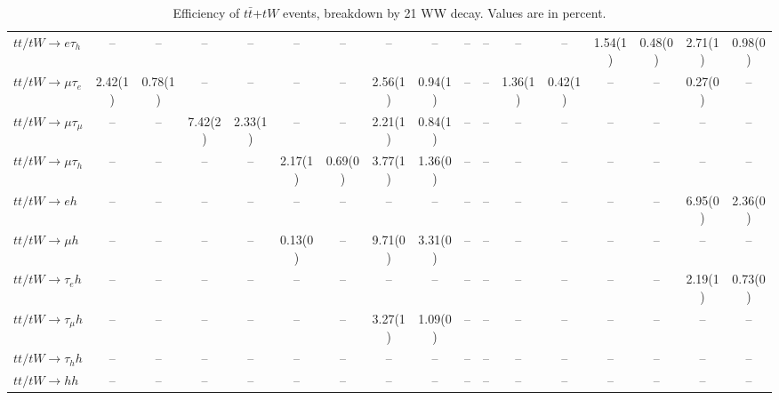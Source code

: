 \begin{sidewaystable}[p]
\begin{tabular}{|l|cc|cc|cc|cc|cc|cc|cc|cc|}
    $tt/tW \to e\tau_{h}$              &    --    &    --    &    --    &    --    &    --    &    --    &    --    &    --    &    --    &    --    &    --    &    --    &  1.54(1) &  0.48(0) &  2.71(1) &  0.98(0) \\ 
    $tt/tW \to \mu\tau_{e}$            &  2.42(1) &  0.78(1) &    --    &    --    &    --    &    --    &  2.56(1) &  0.94(1) &    --    &    --    &  1.36(1) &  0.42(1) &    --    &    --    &  0.27(0) &    --    \\ 
    $tt/tW \to \mu\tau_{\mu}$          &    --    &    --    &  7.42(2) &  2.33(1) &    --    &    --    &  2.21(1) &  0.84(1) &    --    &    --    &    --    &    --    &    --    &    --    &    --    &    --    \\ 
    $tt/tW \to \mu\tau_{h}$            &    --    &    --    &    --    &    --    &  2.17(1) &  0.69(0) &  3.77(1) &  1.36(0) &    --    &    --    &    --    &    --    &    --    &    --    &    --    &    --    \\ 
    $tt/tW \to eh$                     &    --    &    --    &    --    &    --    &    --    &    --    &    --    &    --    &    --    &    --    &    --    &    --    &    --    &    --    &  6.95(0) &  2.36(0) \\ 
    $tt/tW \to \mu h$                  &    --    &    --    &    --    &    --    &  0.13(0) &    --    &  9.71(0) &  3.31(0) &    --    &    --    &    --    &    --    &    --    &    --    &    --    &    --    \\ 
    $tt/tW \to \tau_{e}h$              &    --    &    --    &    --    &    --    &    --    &    --    &    --    &    --    &    --    &    --    &    --    &    --    &    --    &    --    &  2.19(1) &  0.73(0) \\ 
    $tt/tW \to \tau_{\mu}h$            &    --    &    --    &    --    &    --    &    --    &    --    &  3.27(1) &  1.09(0) &    --    &    --    &    --    &    --    &    --    &    --    &    --    &    --    \\ 
    $tt/tW \to \tau_{h}h$              &    --    &    --    &    --    &    --    &    --    &    --    &    --    &    --    &    --    &    --    &    --    &    --    &    --    &    --    &    --    &    --    \\ 
    $tt/tW \to hh$                     &    --    &    --    &    --    &    --    &    --    &    --    &    --    &    --    &    --    &    --    &    --    &    --    &    --    &    --    &    --    &    --    \\ 

    \hline
    \end{tabular}
    \caption{Efficiency of $t\bar{t}$+$tW$ events, breakdown by 21 WW decay.  Values are in percent.}
    \label{sigcomp}
    
\end{sidewaystable}
